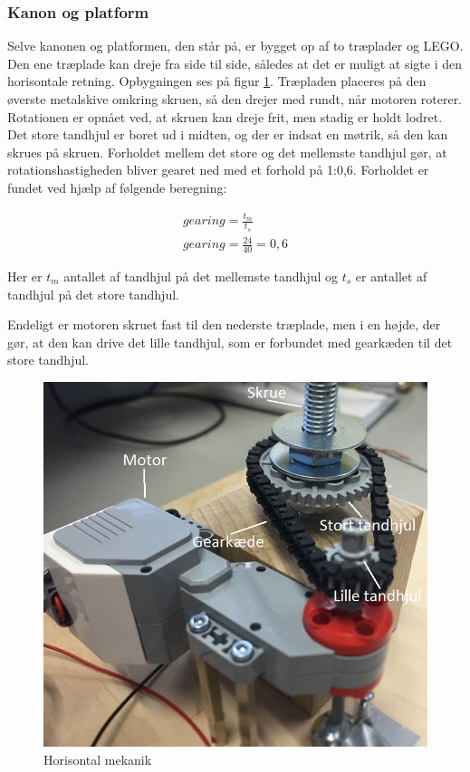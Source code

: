\subsubsection{Kanon og platform}
Selve kanonen og platformen, den står på, er bygget op af to træplader og LEGO. Den ene træplade kan dreje fra side til side, således at det er muligt at sigte i den horisontale retning. Opbygningen ses på figur \ref{fig:Horisontalmekanik}. Træpladen placeres på den øverste metalskive omkring skruen, så den drejer med rundt, når motoren roterer. Rotationen er opnået ved, at skruen kan dreje frit, men stadig er holdt lodret. Det store tandhjul er boret ud i midten, og der er indsat en møtrik, så den kan skrues på skruen. Forholdet mellem det store og det mellemste tandhjul gør, at rotationshastigheden bliver gearet ned med et forhold på 1:0,6. Forholdet er fundet ved hjælp af følgende beregning: 

\begin{align}
	gearing=\frac{t_{m}}{t_{s}} \\ \nonumber
	gearing=\frac{24}{40}=0,6
\end{align}

Her er $t_{m}$ antallet af tandhjul på det mellemste tandhjul og $t_{s}$ er antallet af tandhjul på det store tandhjul. 

Endeligt er motoren skruet fast til den nederste træplade, men i en højde, der gør, at den kan drive det lille tandhjul, som er forbundet med gearkæden til det store tandhjul. 

\begin{figure}[H]
	\centering
	\includegraphics[width=1\textwidth]{Afsnit/DesignOgImplementering/images/horisontalMekanik}
	\caption{Horisontal mekanik}
	\label{fig:Horisontalmekanik}
\end{figure}

